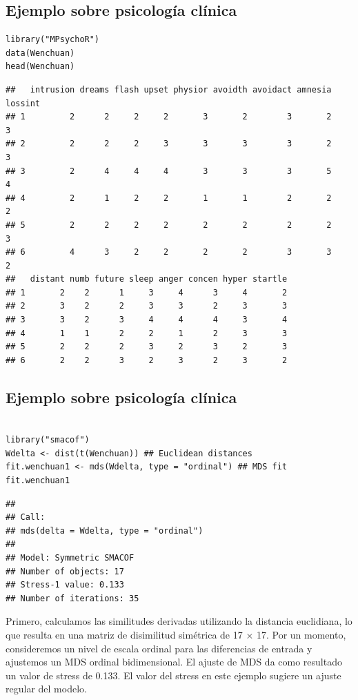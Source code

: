 \documentclass[]{article}
\begin{document}
\subsection{Ejemplo sobre psicología
clínica}\label{ejemplo-sobre-psicologuxeda-cluxednica-1}

\begin{verbatim}
library("MPsychoR")
data(Wenchuan)
head(Wenchuan)
\end{verbatim}

\begin{verbatim}
##   intrusion dreams flash upset physior avoidth avoidact amnesia lossint
## 1         2      2     2     2       3       2        3       2       3
## 2         2      2     2     3       3       3        3       2       3
## 3         2      4     4     4       3       3        3       5       4
## 4         2      1     2     2       1       1        2       2       2
## 5         2      2     2     2       2       2        2       2       3
## 6         4      3     2     2       2       2        3       3       2
##   distant numb future sleep anger concen hyper startle
## 1       2    2      1     3     4      3     4       2
## 2       3    2      2     3     3      2     3       3
## 3       3    2      3     4     4      4     3       4
## 4       1    1      2     2     1      2     3       3
## 5       2    2      2     3     2      3     2       3
## 6       2    2      3     2     3      2     3       2
\end{verbatim}

\subsection{Ejemplo sobre psicología
clínica}\label{ejemplo-sobre-psicologuxeda-cluxednica-2}

\hypertarget{left}{}
\begin{verbatim}

library("smacof")
Wdelta <- dist(t(Wenchuan)) ## Euclidean distances
fit.wenchuan1 <- mds(Wdelta, type = "ordinal") ## MDS fit
fit.wenchuan1
\end{verbatim}

\begin{verbatim}
## 
## Call:
## mds(delta = Wdelta, type = "ordinal")
## 
## Model: Symmetric SMACOF 
## Number of objects: 17 
## Stress-1 value: 0.133 
## Number of iterations: 35
\end{verbatim}

\hypertarget{right}{}
Primero, calculamos las similitudes derivadas utilizando la distancia
euclidiana, lo que resulta en una matriz de disimilitud simétrica de 17
× 17. Por un momento, consideremos un nivel de escala ordinal para las
diferencias de entrada y ajustemos un MDS ordinal bidimensional. El
ajuste de MDS da como resultado un valor de stress de 0.133. El valor
del stress en este ejemplo sugiere un ajuste regular del modelo.
\end{document}
